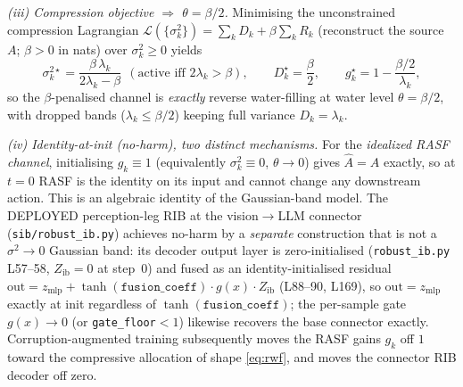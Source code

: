 \begin{theorem}
\emph{(iii) Compression objective $\Rightarrow$ $\theta=\beta/2$.} Minimising the unconstrained compression Lagrangian $\mathcal L(\{\sigma_k^2\})=\sum_k D_k+\beta\sum_k R_k$ (reconstruct the source $A$; $\beta>0$ in nats) over $\sigma_k^2\ge0$ yields
\begin{equation}
\sigma_k^{2\star}=\frac{\beta\,\lambda_k}{2\lambda_k-\beta}\ \ (\text{active iff }2\lambda_k>\beta),\qquad
D_k^\star=\frac{\beta}{2},\qquad
g_k^\star = 1-\frac{\beta/2}{\lambda_k},
\label{eq:beta-half}
\end{equation}
so the $\beta$-penalised channel is \emph{exactly} reverse water-filling at water level $\theta=\beta/2$, with dropped bands ($\lambda_k\le\beta/2$) keeping full variance $D_k=\lambda_k$.

\emph{(iv) Identity-at-init (no-harm), two distinct mechanisms.} For the \emph{idealized RASF channel}, initialising $g_k\equiv1$ (equivalently $\sigma_k^2\equiv0$, $\theta\to0$) gives $\hat A=A$ exactly, so at $t=0$ RASF is the identity on its input and cannot change any downstream action. This is an algebraic identity of the Gaussian-band model. The DEPLOYED perception-leg RIB at the vision$\to$LLM connector (\texttt{sib/robust\_ib.py}) achieves no-harm by a \emph{separate} construction that is not a $\sigma^2\!\to\!0$ Gaussian band: its decoder output layer is zero-initialised (\texttt{robust\_ib.py} L57--58, $Z_{\mathrm{ib}}=0$ at step~0) and fused as an identity-initialised residual $\text{out}=z_{\mathrm{mlp}}+\tanh(\texttt{fusion\_coeff})\cdot g(x)\cdot Z_{\mathrm{ib}}$ (L88--90, L169), so $\text{out}=z_{\mathrm{mlp}}$ exactly at init regardless of $\tanh(\texttt{fusion\_coeff})$; the per-sample gate $g(x)\!\to\!0$ (or \texttt{gate\_floor}$<1$) likewise recovers the base connector exactly. Corruption-augmented training subsequently moves the RASF gains $g_k$ off $1$ toward the compressive allocation of shape \eqref{eq:rwf}, and moves the connector RIB decoder off zero.
\end{theorem}


